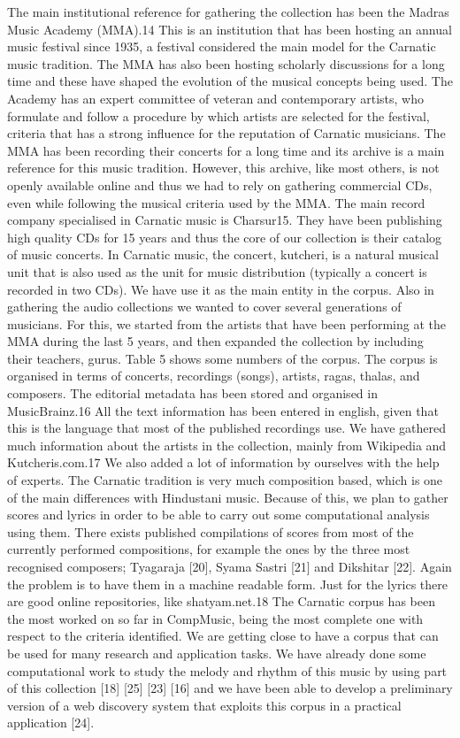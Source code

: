 The main institutional reference for gathering the collection
has been the Madras Music Academy (MMA).14
This is an institution that has been hosting an annual music
festival since 1935, a festival considered the main
model for the Carnatic music tradition. The MMA has
also been hosting scholarly discussions for a long time
and these have shaped the evolution of the musical concepts
being used. The Academy has an expert committee
of veteran and contemporary artists, who formulate
and follow a procedure by which artists are selected for
the festival, criteria that has a strong influence for the
reputation of Carnatic musicians. The MMA has been
recording their concerts for a long time and its archive
is a main reference for this music tradition. However,
this archive, like most others, is not openly available online
and thus we had to rely on gathering commercial
CDs, even while following the musical criteria used by
the MMA. The main record company specialised in Carnatic
music is Charsur15. They have been publishing
high quality CDs for 15 years and thus the core of our
collection is their catalog of music concerts.
In Carnatic music, the concert, kutcheri, is a natural musical
unit that is also used as the unit for music distribution
(typically a concert is recorded in two CDs). We
have use it as the main entity in the corpus. Also in
gathering the audio collections we wanted to cover several
generations of musicians. For this, we started from
the artists that have been performing at the MMA during
the last 5 years, and then expanded the collection by including
their teachers, gurus. Table 5 shows some numbers
of the corpus. The corpus is organised in terms of
concerts, recordings (songs), artists, ragas, thalas, and
composers.
The editorial metadata has been stored and organised in
MusicBrainz.16 All the text information has been entered
in english, given that this is the language that most of the
published recordings use. We have gathered much information
about the artists in the collection, mainly from
Wikipedia and Kutcheris.com.17 We also added a lot of
information by ourselves with the help of experts.
The Carnatic tradition is very much composition based,
which is one of the main differences with Hindustani music.
Because of this, we plan to gather scores and lyrics
in order to be able to carry out some computational analysis
using them. There exists published compilations of
scores from most of the currently performed compositions,
for example the ones by the three most recognised
composers; Tyagaraja [20], Syama Sastri [21] and Dikshitar
[22]. Again the problem is to have them in a machine
readable form. Just for the lyrics there are good
online repositories, like shatyam.net.18
The Carnatic corpus has been the most worked on so far
in CompMusic, being the most complete one with respect
to the criteria identified. We are getting close to
have a corpus that can be used for many research and
application tasks. We have already done some computational
work to study the melody and rhythm of this music
by using part of this collection [18] [25] [23] [16] and we
have been able to develop a preliminary version of a web
discovery system that exploits this corpus in a practical
application [24].

